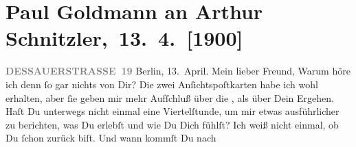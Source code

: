 

         
         \renewcommand{\erwaehntePersonen}{Personen: Paul Goldmann, Eberhard König, Agnes Sorma}
         \renewcommand{\erwaehnteInstitutionen}{Institutionen: Lessing-Theater}
         \renewcommand{\erwaehnteOrte}{Orte: Berlin, Dessauer Straße, Schauspielhaus, Wien}
         \renewcommand{\erwaehnteWerke}{Werke: Gevatter Tod. Ein Märchen von der Menschheit. Drama in fünf Aufzügen, Liebelei. Schauspiel in drei Akten}
               \section[ Paul Goldmann an Arthur Schnitzler, 13. 4. {[}1900{]}]{ Paul Goldmann an Arthur Schnitzler, 13. 4. {[}1900{]}}\nopagebreak{}\rehead{ }\begin{ledgroupsized}[t]{13cm}\normalsize\beginnumbering{} \toendnotes[C]{\smallbreak\pagebreak[2]} 
\toendnotes[C]{\smallbreak}\pstart
           \noindent{}{\pb}\textcolor{gray}{\textbf{DESSAUERSTRASSE 19}}\pend
           \pstart
           \raggedleft{}Berlin, 13. April.\pend
           \pstart{}Mein lieber Freund,\pend\pstart
           Warum höre ich denn ſo gar nichts von Dir? Die zwei Anſichtspoſtkarten habe ich wohl
               erhalten, aber ſie geben mir mehr Aufſchluß über die \label{K_L02910-1v}\label{K_L02910-1h}, als über Dein Ergehen. Haſt Du unterwegs nicht einmal eine Viertelſtunde, um
               mir etwas ausführlicher zu berichten, was Du erlebſt und wie Du Dich fühlſt? Ich weiß
               nicht einmal, ob Du ſchon zurück biſt. Und wann kommſt Du nach \label{K_L02910-2v}
\end{ledgroupsized}
